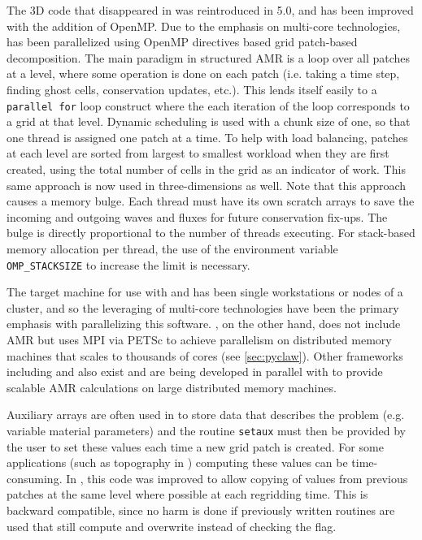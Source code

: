 The 3D \amrclaw code that disappeared in  was reintroduced in
5.0, and has been improved with the addition of OpenMP.
Due to the emphasis on multi-core technologies, \amrclaw has been parallelized
using OpenMP directives based grid patch-based decomposition.  
The main paradigm in structured AMR is a loop over
all patches at a level, where some operation is done on each patch
(i.e. taking a time step, finding ghost cells, conservation
updates, etc.). This lends itself easily to a {\tt parallel for} loop
construct where the each iteration of the loop corresponds to a
grid at that level. Dynamic scheduling is used with a chunk size
of one, so that one thread is assigned one patch at a time. 
To help with load balancing, patches at
each level are sorted from largest to smallest workload when they
are first created, using
the total number of cells in the grid as an indicator of work.
This same approach is now used in three-dimensions as well. 
Note that this approach causes a memory bulge. Each thread
must have its own scratch arrays to save the incoming and
outgoing waves and fluxes for future conservation fix-ups. 
The bulge is directly proportional to the number
of threads executing. For stack-based memory allocation per
thread, the use of the environment variable 
{\tt OMP\_STACKSIZE} to increase the limit is necessary.


The target machine for use with \amrclaw and \geoclaw
has been single workstations or nodes of a cluster, and so
the leveraging of multi-core technologies have been the primary
emphasis with parallelizing this software.  
\pyclaw, on the other hand, does not include AMR but uses MPI via
PETSc to achieve parallelism on distributed memory machines that scales to
thousands of cores (see \cref{sec:pyclaw}).
Other frameworks including
\forestclaw \cite{Burstedde:we} and \boxlib {} also
exist and are being developed in parallel with \amrclaw to provide scalable
AMR calculations on large distributed memory machines.



Auxiliary arrays are often used in \clawpack to store data that 
describes the problem (e.g.  variable material parameters) and the routine
\texttt{setaux} must then be provided by the user to set these values each time a
new grid patch is created.  For some applications (such as topography in
\geoclaw) computing these values can be time-consuming.  In ,
this code was improved to allow copying of values from previous patches at
the same level where possible at each regridding time. 
This is backward compatible, since no harm is done if previously
written routines are used that still compute and overwrite instead of
checking the flag.  

